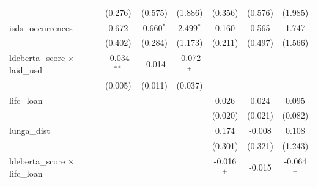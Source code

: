 \begin{tabular}{lcccccc}
                                          & (0.276)                                     & (0.575)                   & (1.886)                       & (0.356)                                     & (0.576)                   & (1.985)\\   
   isds\_occurrences                      & 0.672                                       & 0.660$^{*}$               & 2.499$^{*}$                   & 0.160                                       & 0.565                     & 1.747\\   
                                          & (0.402)                                     & (0.284)                   & (1.173)                       & (0.211)                                     & (0.497)                   & (1.566)\\   
   ldeberta\_score $\times$ laid\_usd     & -0.034$^{**}$                               & -0.014                    & -0.072$^{+}$                  &                                             &                           &   \\   
                                          & (0.005)                                     & (0.011)                   & (0.037)                       &                                             &                           &   \\   
   lifc\_loan                             &                                             &                           &                               & 0.026                                       & 0.024                     & 0.095\\   
                                          &                                             &                           &                               & (0.020)                                     & (0.021)                   & (0.082)\\   
   lunga\_dist                            &                                             &                           &                               & 0.174                                       & -0.008                    & 0.108\\   
                                          &                                             &                           &                               & (0.301)                                     & (0.321)                   & (1.243)\\   
   ldeberta\_score $\times$ lifc\_loan    &                                             &                           &                               & -0.016$^{+}$                                & -0.015                    & -0.064$^{+}$\\   

\end{tabular}
